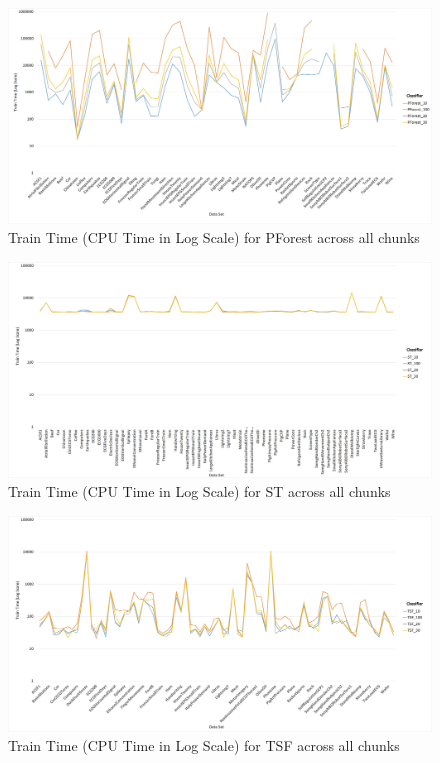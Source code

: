 \begin{figure} [!htb]
  \centering
  \includegraphics[width=\textwidth]{Duration_pforest.jpg}
  \caption{Train Time (CPU Time in Log Scale) for PForest across all chunks}
  \label{fig:DurationPF}
\end{figure}

\begin{figure} [!htb]
  \centering
  \includegraphics[width=\textwidth]{Duration_st.jpg}
  \caption{Train Time (CPU Time in Log Scale) for ST across all chunks}
  \label{fig:DurationST}
\end{figure}

\begin{figure} [!htb]
  \centering
  \includegraphics[width=\textwidth]{Duration_tsf.jpg}
  \caption{Train Time (CPU Time in Log Scale) for TSF across all chunks}
  \label{fig:DurationTSF}
\end{figure}

